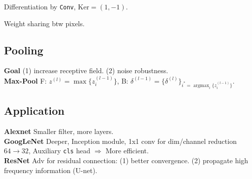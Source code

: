 Differentiation by \verb|Conv|, \(\text{Ker} = (1, -1)\).

Weight sharing btw pixels.

\subsection*{Pooling}
\textbf{Goal} (1) increase receptive field. (2) noise robustness. \\
\textbf{Max-Pool} \textsf{F}: \(z^{(l)}=\max \{z_{i}^{(l-1)}\}\), \textsf{B}: \(\delta^{(l-1)}=\{\delta^{(l)}\}_{i^{*}=\operatorname{argmax}_{i}\{z_{i}^{(l-1)}\}}\).

\subsection*{Application}
\textbf{Alexnet} Smaller filter, more layers. \\
\textbf{GoogLeNet} Deeper, Inception module, 1x1 conv for dim/channel reduction\(64\to 32\), Auxiliary \verb|cls| head \(\Rightarrow\) More efficient. \\
\textbf{ResNet} Adv for residual connection: (1) better convergence. (2) propagate high frequency information (U-net).

